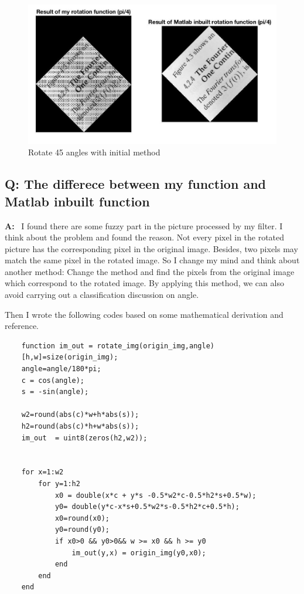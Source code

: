 \documentclass{article}
\begin{document}
\begin{figure}[htbp]
    \centering
    \includegraphics[scale = 0.25]{fig21.jpg}
    \caption{Rotate 45 angles with initial method}
    \label{fig21}
\end{figure}

\subsection*{Q: The differece between my function and Matlab inbuilt function}
\textbf{A: }~I found there are some fuzzy part in the picture processed by my filter. I think about the problem and found the reason. Not every pixel in the rotated picture has the corresponding pixel in the original image. Besides, two pixels may match the same pixel in the rotated image. So I change my mind and think about another method: Change the method and find the pixels from the original image which correspond to the rotated image. By applying this method, we can also avoid carrying out a classification discussion on angle.

Then I wrote the following codes based on some mathematical derivation and reference.
\begin{lstlisting}
    function im_out = rotate_img(origin_img,angle)
    [h,w]=size(origin_img);  
    angle=angle/180*pi;
    c = cos(angle);  
    s = -sin(angle);  
    
    w2=round(abs(c)*w+h*abs(s));  
    h2=round(abs(c)*h+w*abs(s));  
    im_out  = uint8(zeros(h2,w2));
      
      
    for x=1:w2  
        for y=1:h2  
            x0 = double(x*c + y*s -0.5*w2*c-0.5*h2*s+0.5*w);  
            y0= double(y*c-x*s+0.5*w2*s-0.5*h2*c+0.5*h);               
            x0=round(x0);          
            y0=round(y0);          
            if x0>0 && y0>0&& w >= x0 && h >= y0  
                im_out(y,x) = origin_img(y0,x0);  
            end  
        end  
    end  
\end{lstlisting}
\end{document}
